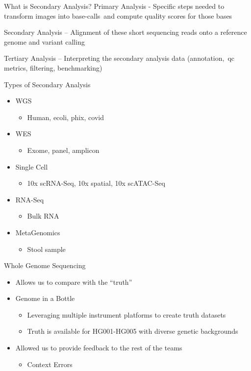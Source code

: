 \documentclass[bigger]{beamer}
\begin{document}
\begin{frame}[label={sec:org48935f3}]{What is Secondary Analysis?}
Primary Analysis - Specific steps needed to transform images into base-calls and compute quality scores for those bases

Secondary Analysis – Alignment of these short sequencing reads onto a reference genome and variant calling

Tertiary Analysis – Interpreting the secondary analysis data (annotation, qc metrics, filtering, benchmarking)
\end{frame}

\begin{frame}[label={sec:org46ffab4}]{Types of Secondary Analysis}
\begin{itemize}
\item WGS
\begin{itemize}
\item Human, ecoli, phix, covid
\end{itemize}
\item WES
\begin{itemize}
\item Exome, panel, amplicon
\end{itemize}
\item Single Cell
\begin{itemize}
\item 10x scRNA-Seq, 10x spatial, 10x scATAC-Seq
\end{itemize}
\item RNA-Seq
\begin{itemize}
\item Bulk RNA
\end{itemize}
\item MetaGenomics
\begin{itemize}
\item Stool sample
\end{itemize}
\end{itemize}
\end{frame}

\begin{frame}[label={sec:orgfb2d51b}]{Whole Genome Sequencing}
\begin{itemize}
\item Allows us to compare with the “truth”

\item Genome in a Bottle
\begin{itemize}
\item Leveraging multiple instrument platforms to create truth datasets
\item Truth is available for HG001-HG005 with diverse genetic backgrounds
\end{itemize}

\item Allowed us to provide feedback to the rest of the teams
\begin{itemize}
\item Context Errors
\end{itemize}
\end{itemize}
\end{frame}
\end{document}
